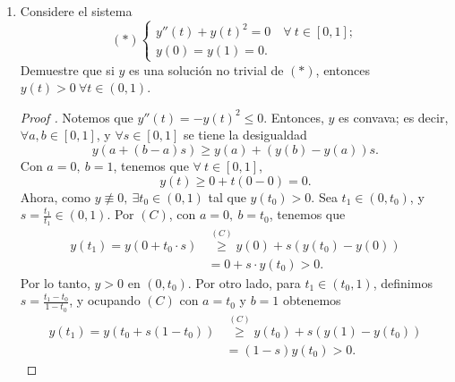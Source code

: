 \documentclass[a4paper]{report}
\begin{document}
\begin{enumerate}
		\item Considere el sistema
		\[
		(*) \begin{cases}
			y''(t) + y(t)^2 = 0 \quad \forall\ t \in [0,1]; \\
			y(0) = y(1) = 0.
		\end{cases}
		\]
		Demuestre que si $y$ es una solución no trivial de $(*)$, entonces $y(t) > 0 \ \forall t \in (0,1)$.
		\begin{proof}[Proof ]
			Notemos que $y''(t) = -y(t)^2 \leq 0$. Entonces, $y$ es convava; es decir, $\forall a,b\in [0,1]$, y $\forall s \in [0,1]$ se tiene la desigualdad
			\[
			y(a+(b-a)s) \geq y(a) + (y(b)-y(a))s. \tag{$C$}
			\]
			\noindent Con $a=0,\ b=1$, tenemos que $\forall \ t \in [0,1]$,
			\[
			y(t) \geq 0 + t(0 - 0) = 0.
			\]
			\noindent Ahora, como $y \not\equiv 0,\ \exists t_0 \in (0,1)$ tal que $y(t_0) > 0$. Sea $t_1 \in (0,t_0)$, y $s = \frac{t_1}{t_1} \in (0,1)$. Por $(C)$, con $a = 0,\ b=t_0$, tenemos que
			\begin{align*}
				y(t_1) = y(0 + t_0\cdot s) & \stackrel{(C)}{\geq} y(0) + s(y(t_0)-y(0)) \\
				& = 0 + s \cdot y(t_0) > 0
			.\end{align*}
			\noindent Por lo tanto, $y > 0$ en $(0,t_0)$. Por otro lado, para $t_1 \in (t_0, 1)$, definimos $s = \frac{t_1 - t_0}{1-t_0}$, y ocupando $(C)$ con $a = t_0$ y $b = 1$ obtenemos
			\begin{align*}
				y(t_1) = y(t_0 + s(1-t_0)) & \stackrel{(C)}{\geq} y(t_0) + s(y(1)-y(t_0)) \\
				& = (1-s)y(t_0) > 0
			.\end{align*}
		\end{proof}


\end{enumerate}
\end{document}
